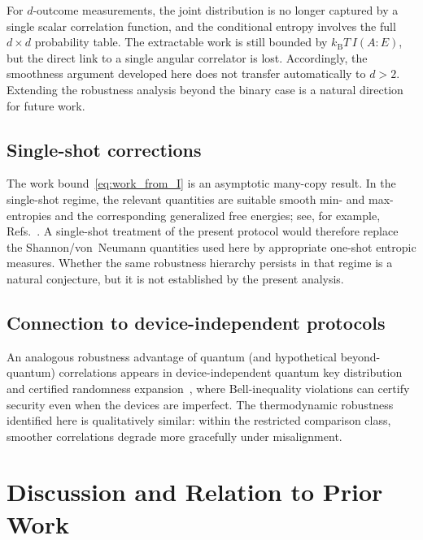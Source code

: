\documentclass[pra,twocolumn,showpacs,preprintnumbers,amsmath,amssymb,longbibliography,
               superscriptaddress]{revtex4-2}
\begin{document}
{For $d$-outcome measurements, the joint distribution is no longer
captured by a single scalar correlation function, and the conditional
entropy involves the full $d\times d$ probability table.
The extractable work is still bounded by
$k_{\mathrm{B}}T\, I(A{:}E)$, but the direct link to a single angular
correlator is lost.
Accordingly, the smoothness argument developed here does not transfer
automatically to $d>2$.
Extending the robustness analysis beyond the binary case is a natural
direction for future work.}

\subsection{{Single-shot corrections}}
\label{sec:single_shot}

{The work bound~\eqref{eq:work_from_I} is an asymptotic
many-copy result.
In the single-shot regime, the relevant quantities are suitable smooth
min- and max-entropies and the corresponding generalized free energies;
see, for example,
Refs.~\cite{Brandao2015b,Horodecki2013}.
A single-shot treatment of the present protocol would therefore replace
the Shannon/von~Neumann quantities used here by appropriate one-shot
entropic measures.
Whether the same robustness hierarchy persists in that regime is a
natural conjecture, but it is not established by the present analysis.}

\subsection{{Connection to device-independent protocols}}
\label{sec:DI}

{An analogous robustness advantage of quantum (and hypothetical
beyond-quantum) correlations appears in device-independent quantum key
distribution~\cite{acin2007} and certified randomness
expansion~\cite{acin2012}, where Bell-inequality violations can certify
security even when the devices are imperfect.
The thermodynamic robustness identified here is qualitatively similar:
within the restricted comparison class, smoother correlations degrade
more gracefully under misalignment.}

\section{{Discussion and Relation to Prior Work}}
\label{sec:discussion}
\end{document}
